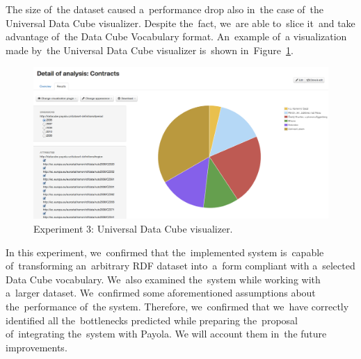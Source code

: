 The size of~the dataset caused a~performance drop also in~the case of~the
Universal Data Cube visualizer. Despite the~fact, we~are able to~slice it~and 
take advantage of~the Data Cube Vocabulary format. An~example of~a visualization 
made by~the Universal Data Cube visualizer is~shown in~Figure~\ref{fig:contracts-uni-dcv}.

\begin{figure}
  \centering
  \includegraphics[width=140mm]{img/contracts-uni-dcv.png}
  \caption{Experiment 3: Universal Data Cube visualizer.}
  \label{fig:contracts-uni-dcv}
\end{figure}

In this experiment, we~confirmed that the~implemented system is~capable of~transforming an~arbitrary RDF dataset into~a~form compliant with a~selected Data 
Cube vocabulary. We~also examined the~system while working with a~larger 
dataset. We~confirmed some aforementioned assumptions about the~performance of~the system. Therefore, we~confirmed that we~have correctly identified all the~bottlenecks predicted while preparing the~proposal of~integrating the~system with Payola. 
We will account them in~the future improvements.

